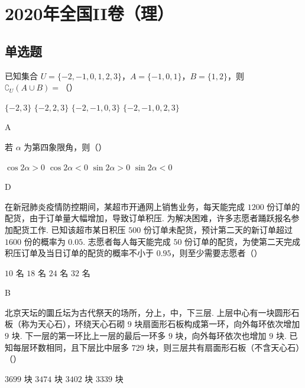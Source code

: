 \chapter{2020年全国II卷（理）}

\section{单选题}

\begin{problem}
已知集合 \(U=\{-2,-1,0,1,2,3\}\)，\(A=\{-1,0,1\}\)，\(B=\{1,2\}\)，则 \(\complement_U\left( A\cup B \right)=\)（\quad）

\choices
    {\(\{-2,3\}\)}
    {\(\{-2,2,3\}\)}
    {\(\{-2,-1,0,3\}\)}
    {\(\{-2,-1,0,2,3\}\)}
\end{problem}

\begin{answer}
A
\end{answer}

\begin{problem}
若 \(\alpha\) 为第四象限角，则（\quad）

\choices
    {\(\cos 2\alpha>0\)}
    {\(\cos 2\alpha<0\)}
    {\(\sin 2\alpha>0\)}
    {\(\sin 2\alpha<0\)}
\end{problem}

\begin{answer}
D
\end{answer}

\begin{problem}
在新冠肺炎疫情防控期间，某超市开通网上销售业务，每天能完成 \(1200\) 份订单的配货，由于订单量大幅增加，导致订单积压. 为解决困难，许多志愿者踊跃报名参加配货工作. 已知该超市某日积压 \(500\) 份订单未配货，预计第二天的新订单超过 \(1600\) 份的概率为 \(0.05\). 志愿者每人每天能完成 \(50\) 份订单的配货，为使第二天完成积压订单及当日订单的配货的概率不小于 \(0.95\)，则至少需要志愿者（\quad）

\choices
    {\(10\) 名}
    {\(18\) 名}
    {\(24\) 名}
    {\(32\) 名}
\end{problem}

\begin{answer}
B
\end{answer}

\begin{problem}
北京天坛的圜丘坛为古代祭天的场所，分上，中，下三层. 上层中心有一块圆形石板（称为天心石），环绕天心石砌 \(9\) 块扇面形石板构成第一环，向外每环依次增加 \(9\) 块. 下一层的第一环比上一层的最后一环多 \(9\) 块，向外每环依次也增加 \(9\) 块. 已知每层环数相同，且下层比中层多 \(729\) 块，则三层共有扇面形石板（不含天心石）（\quad）

\choices
    {\(3699\) 块}
    {\(3474\) 块}
    {\(3402\) 块}
    {\(3339\) 块}
\end{problem}

